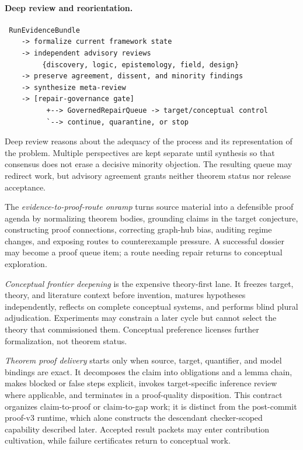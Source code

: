 \documentclass[11pt]{article}
\begin{document}
\paragraph{Deep review and reorientation.}
\begin{verbatim}
 RunEvidenceBundle
    -> formalize current framework state
    -> independent advisory reviews
         {discovery, logic, epistemology, field, design}
    -> preserve agreement, dissent, and minority findings
    -> synthesize meta-review
    -> [repair-governance gate]
          +--> GovernedRepairQueue -> target/conceptual control
          `--> continue, quarantine, or stop
\end{verbatim}
Deep review reasons about the adequacy of the process and its representation of
the problem.  Multiple perspectives are kept separate until synthesis so that
consensus does not erase a decisive minority objection.  The resulting queue
may redirect work, but advisory agreement grants neither theorem status nor
release acceptance.

The \emph{evidence-to-proof-route onramp} turns source material into a defensible proof agenda by normalizing theorem bodies, grounding claims in the target conjecture, constructing proof connections, correcting graph-hub bias, auditing regime changes, and exposing routes to counterexample pressure. A successful dossier may become a proof queue item; a route needing repair returns to conceptual exploration.

\emph{Conceptual frontier deepening} is the expensive theory-first lane. It freezes target, theory, and literature context before invention, matures hypotheses independently, reflects on complete conceptual systems, and performs blind plural adjudication. Experiments may constrain a later cycle but cannot select the theory that commissioned them. Conceptual preference licenses further formalization, not theorem status.

\emph{Theorem proof delivery} starts only when source, target, quantifier, and model bindings are exact. It decomposes the claim into obligations and a lemma chain, makes blocked or false steps explicit, invokes target-specific inference review where applicable, and terminates in a proof-quality disposition. This contract organizes claim-to-proof or claim-to-gap work; it is distinct from the post-commit proof-v3 runtime, which alone constructs the descendant checker-scoped capability described later. Accepted result packets may enter contribution cultivation, while failure certificates return to conceptual work.
\end{document}
